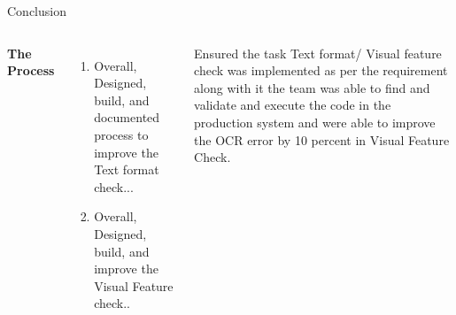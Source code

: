 \documentclass[aspectratio=169,xcolor=dvipsnames]{beamer}
\begin{document}
\begin{frame}{Conclusion}
    \tableofcontents

    \begin{columns}[c] %

        \textbf{The Process}
        \begin{enumerate}
            \item Overall, Designed, build, and documented process to improve the Text format check...
            \item Overall, Designed, build, and improve the Visual Feature check.. 
        \end{enumerate}

         Ensured the task Text format/ Visual feature check was implemented as per the requirement along with it the team was able to find and validate and execute the code in the production system and were able to improve the OCR error by 10 percent in Visual Feature Check.

    \end{columns}   \\

\end{frame}
\end{document}
